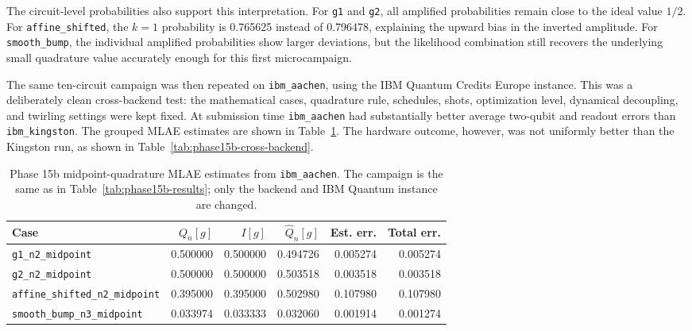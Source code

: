 The circuit-level probabilities also support this interpretation. For
\texttt{g1} and \texttt{g2}, all amplified probabilities remain close to the
ideal value \(1/2\). For \texttt{affine\_shifted}, the \(k=1\) probability is
0.765625 instead of 0.796478, explaining the upward bias in the inverted
amplitude. For \texttt{smooth\_bump}, the individual amplified probabilities
show larger deviations, but the likelihood combination still recovers the
underlying small quadrature value accurately enough for this first
microcampaign.

The same ten-circuit campaign was then repeated on \texttt{ibm\_aachen}, using
the IBM Quantum Credits Europe instance. This was a deliberately clean
cross-backend test: the mathematical cases, quadrature rule, schedules,
shots, optimization level, dynamical decoupling, and twirling settings were
kept fixed. At submission time \texttt{ibm\_aachen} had substantially better
average two-qubit and readout errors than \texttt{ibm\_kingston}. The grouped
MLAE estimates are shown in Table~\ref{tab:phase15b-aachen-results}. The
hardware outcome, however, was not uniformly better than the Kingston run, as
shown in Table~\ref{tab:phase15b-cross-backend}.

\begin{table}[h]
\centering
\begin{tabular}{lrrrrr}
\toprule
Case & \(Q_n[g]\) & \(I[g]\) & \(\widehat Q_n[g]\) & Est. err. & Total err. \\
\midrule
\texttt{g1\_n2\_midpoint} & 0.500000 & 0.500000 & 0.494726 & 0.005274 & 0.005274 \\
\texttt{g2\_n2\_midpoint} & 0.500000 & 0.500000 & 0.503518 & 0.003518 & 0.003518 \\
\texttt{affine\_shifted\_n2\_midpoint} & 0.395000 & 0.395000 & 0.502980 & 0.107980 & 0.107980 \\
\texttt{smooth\_bump\_n3\_midpoint} & 0.033974 & 0.033333 & 0.032060 & 0.001914 & 0.001274 \\
\bottomrule
\end{tabular}
\caption{Phase 15b midpoint-quadrature MLAE estimates from
\texttt{ibm\_aachen}. The campaign is the same as in
Table~\ref{tab:phase15b-results}; only the backend and IBM Quantum instance are
changed.}
\label{tab:phase15b-aachen-results}
\end{table}


